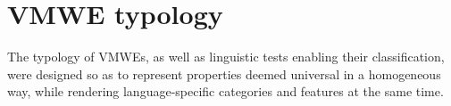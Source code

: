 \documentclass[output=paper,
modfonts,
]{langscibook}
\begin{document}
\section{VMWE typology}
\label{sec:typology}
%
The typology of VMWEs, 
as well as linguistic tests enabling their %
classification, were designed so as to represent %
properties deemed universal in a homogeneous way, while rendering language-specific categories and features at the same time. %
\end{document}
